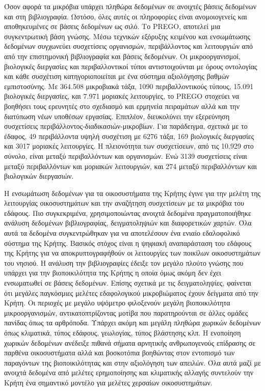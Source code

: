 \documentclass[11pt]{article}
\begin{document}
Όσον αφορά τα μικρόβια
υπάρχει πληθώρα δεδομένων σε ανοιχτές βάσεις δεδομένων και στη
βιβλιογραφία.
Ωστόσο, όλες αυτές οι πληροφορίες είναι ανομοιογενείς και αποθηκευμένες σε 
βάσεις δεδομένων ως σιλό. Το \textlatin{PREGO}, αποτελεί μια συγκεντρωτική βάση γνώσης. Μέσω
τεχνικών εξόρυξης κειμένου και ενσωμάτωσης δεδομένων συγχωνεύει 
συσχετίσεις οργανισμών, περιβάλλοντος και λειτουργιών από
από την επιστημονική βιβλιογραφία και βάσεις δεδομένων. 
Οι μικροοργανισμοί, βιολογικές διεργασίες και περιβαλλοντικοί τύποι αντιστοιχούνται
με όρους οντολογίας και κάθε συσχέτιση κατηγοριοποιείται με ένα σύστημα αξιολόγησης 
βαθμών εμπιστοσύνης.
Με 364.508 μικροβιακά τάξα, 1090 περιβαλλοντικούς τύπους, 15.091 βιολογικές διεργασίες,
και 7.971 μοριακές λειτουργίες, το \textlatin{PREGO} στοχεύει να βοηθήσει τους ερευνητές στο 
σχεδιασμό και ερμηνεία πειραμάτων αλλά και την διατύπωση νέων υποθέσων εργασίας. Επιπλέον, διευκολύνει την εξερεύνηση
συσχετίσεις περιβάλλοντος-διαδικασιών-μικροβίων.
Για παράδειγμα, σχετικά με το έδαφος, 49 περιβάλλοντα υψηλή συσχέτιση με 
6276 τάξα, 169 βιολογικές διεργασίες και 3017 μοριακές λειτουργίες.
Η πλειονότητα των συσχετίσεων, από τις 10.929 στο σύνολο, είναι μεταξύ περιβαλλόντων 
και οργανισμών. Ενώ 3139 συσχετίσεις είναι μεταξύ περιβαλλόντων και μοριακών λειτουργιών, 
και 274 μεταξύ περιβαλλόντων και βιολογικών διεργασιών.

Η ενσωμάτωση δεδομένων για τα οικοσυστήματα της Κρήτης έγινε για την μελέτη
της λειτουργίας οικοσυστημάτων και την αναζήτηση συσχετίσεων με τα 
μικρόβια του εδάφους.
Πιο συγκεκριμένα, χρησιμοποιώντας ανοιχτά δεδομένα πραγματοποιήθηκε ανάλυση 
δεδομένων βιβλιογραφίας, δειγματοληψιών και διαφορετικών χαρτών. Όλα αυτά τα δεδομένα
συγκεντρώθηκαν για να αποτελέσουν ένα ενιαίο εδαλοφολικό σύστημα της Κρήτης. 
Βασικός στόχος είναι η ψηφιακή αναπαράσταση του εδάφους της Κρήτης για να αποκρυπτογραφήθούν
οι λειτουργίες των ποικίλων οικοσυστημάτων του νησιού.
Η ανάλυση την βιβλιογραφίες έδειξε τον μεγάλο πλούτο γνώσης που υπάρχει για την 
βιοποικιλότητα της Κρήτης η οποία όμως ακόμη δεν έχει ενσωματωθεί σε βάσεις 
δεδομένων. 
Επίσης σχετικά με τις δειγματοληψίες, φαίνεται ότι μεγάλες παγκόσμιες 
μελέτες εδαφολογικού μικροβιώματος έχουν δείγματα από την Κρήτη. 
Οι περιοχές με μεγάλο υψόμετρο φιλοξενούν μεγάλη βιοποικιλότητα
μικροοργανισμών, αντικατοπτρίζοντας μοτίβα που παρατηρούνται σε άλλες ομάδες πανίδας όπως τα αρθρόποδα.
Υπάρχει ακόμη και μεγάλη πληθώρα χωρικών δεδομένων όπως κλιματικά, 
τύπος εδάφους, γεωλογίας, τύπος βλάστησης κλπ.
Η ενοποίηση χωρικών δεδομένων ανέδειξε πιθανά σήματα αρνητικής ανθρωπογενούς επίδρασης σε παρθένα οικοσυστήματα αλλά και 
βοσκοτόπια βοηθώντας στον εντοπισμό των παραγόντων της βιοποικιλότητας και στην αξιολόγηση των απειλών.
Όλα αυτά μαζί με ανοιχτά δεδομένα από μελέτες ερημοποίησης και κλιματικής αλλαγής
συντελούν την Κρήτη ένα σημαντικό μοντέλο για μελέτες χερσαίων οικοσυστημάτων.
\end{document}
